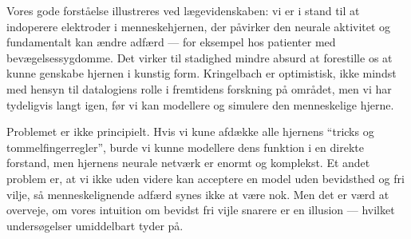 \documentclass{article}
\begin{document}
Vores gode forståelse illustreres ved lægevidenskaben: vi er i stand til at indoperere elektroder i menneskehjernen, der påvirker den neurale aktivitet og fundamentalt kan ændre adfærd --- for eksempel hos patienter med bevægelsessygdomme. Det virker til stadighed mindre absurd at forestille os at kunne genskabe hjernen i kunstig form. Kringelbach er optimistisk, ikke mindst med hensyn til datalogiens rolle i fremtidens forskning på området, men vi har tydeligvis langt igen, før vi kan modellere og simulere den menneskelige hjerne. 

Problemet er ikke principielt. Hvis vi kune afdække alle hjernens ``tricks og tommelfingerregler'', burde vi kunne modellere dens funktion i en direkte forstand, men hjernens neurale netværk er enormt og komplekst. Et andet problem er, at vi ikke uden videre kan acceptere en model uden bevidsthed og fri vilje, så menneskelignende adfærd synes ikke at være nok. Men det er værd at overveje, om vores intuition om bevidst fri vijle snarere er en illusion --- hvilket undersøgelser umiddelbart tyder på.
\end{document}

